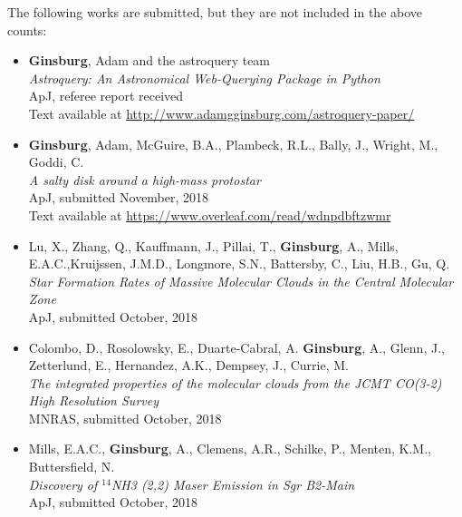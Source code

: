 \vspace{24pt}
The following works are submitted, but they are not included in the above counts:

\begin{itemize}
    \item \textbf{Ginsburg}, Adam and the astroquery team \\
        \textit{Astroquery: An Astronomical Web-Querying Package in Python} \\
ApJ, referee report received \\ 
Text available at \url{http://www.adamgginsburg.com/astroquery-paper/}

    \item \textbf{Ginsburg}, Adam, McGuire, B.A., Plambeck, R.L., Bally, J., Wright, M., Goddi, C. \\
        \textit{A salty disk around a high-mass protostar} \\
ApJ, submitted November, 2018 \\
Text available at \url{https://www.overleaf.com/read/wdnpdbftzwmr} 

\item Lu, X., Zhang, Q., Kauffmann, J.,  Pillai, T.,  
    \textbf{Ginsburg}, A.,  Mills, E.A.C.,Kruijssen, J.M.D., 
    Longmore, S.N.,  Battersby, C.,   Liu, H.B.,  Gu, Q. \\
    \textit{Star Formation Rates of Massive Molecular Clouds in the Central Molecular Zone}\\
    ApJ, submitted October, 2018

\item Colombo, D.,   Rosolowsky, E., Duarte-Cabral, A. \textbf{Ginsburg}, A.,
    Glenn, J.,  Zetterlund, E., Hernandez, A.K., Dempsey, J., Currie, M. \\
    \textit{The integrated properties of the molecular clouds from the JCMT CO(3-2) High Resolution Survey} \\
    MNRAS, submitted October, 2018
    
\item Mills, E.A.C., \textbf{Ginsburg}, A., Clemens, A.R., Schilke, P., Menten, K.M., Buttersfield, N. \\
    \textit{Discovery of $^{14}$NH3 (2,2) Maser Emission in Sgr B2-Main} \\
    ApJ, submitted October, 2018

\end{itemize}
